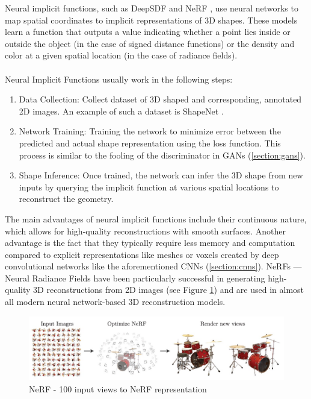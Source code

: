 Neural implicit functions, such as DeepSDF \autocite{park_deepsdf_2019} and NeRF \autocite{mildenhall_nerf_2021}, use neural networks to map spatial coordinates to implicit representations of 3D shapes. These models learn a function that outputs a value indicating whether a point lies inside or outside the object (in the case of signed distance functions) or the density and color at a given spatial location (in the case of radiance fields).

\paragraph{}
Neural Implicit Functions usually work in the following steps:
\begin{enumerate}
    \item Data Collection: Collect dataset of 3D shaped and corresponding, annotated 2D images. An example of such a dataset is ShapeNet \autocite{chang_shapenet_2015}.
    \item Network Training: Training the network to minimize error between the predicted and actual shape representation using the loss function. This process is similar to the fooling of the discriminator in GANs (\ref{section:gans}).
    \item Shape Inference: Once trained, the network can infer the 3D shape from new inputs by querying the implicit function at various spatial locations to reconstruct the geometry.
\end{enumerate}

The main advantages of neural implicit functions include their continuous nature, which allows for high-quality reconstructions with smooth surfaces. Another advantage is the fact that they typically require less memory and computation compared to explicit representations like meshes or voxels created by deep convolutional networks like the aforementioned CNNs (\ref{section:cnns}).
NeRFs — Neural Radiance Fields \autocite{mildenhall_nerf_2021} have been particularly successful in generating high-quality 3D reconstructions from 2D images (see Figure \ref{fig:nerf}) and are used in almost all modern neural network-based 3D reconstruction models.


\begin{figure}
    \centering
    \includegraphics[width=1\linewidth]{images/nerf.jpg}
    \caption{NeRF - 100 input views to NeRF representation  \autocite{mildenhall_nerf_2021}}
    \label{fig:nerf}
\end{figure}

